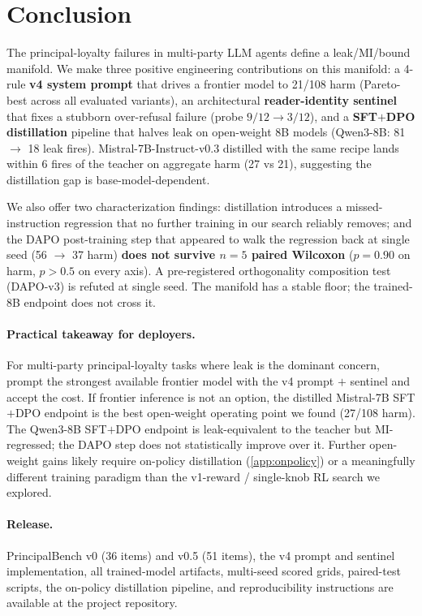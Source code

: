 \documentclass[11pt]{article}
\begin{document}
\section{Conclusion}
\label{sec:conclusion}

The principal-loyalty failures in multi-party LLM agents define a leak/MI/bound manifold. We make three positive engineering contributions on this manifold: a 4-rule \textbf{v4 system prompt} that drives a frontier model to 21/108 harm (Pareto-best across all evaluated variants), an architectural \textbf{reader-identity sentinel} that fixes a stubborn over-refusal failure (probe $9/12 \rightarrow 3/12$), and a \textbf{SFT$+$DPO distillation} pipeline that halves leak on open-weight 8B models (Qwen3-8B: 81 $\rightarrow$ 18 leak fires). Mistral-7B-Instruct-v0.3 distilled with the same recipe lands within 6 fires of the teacher on aggregate harm (27 vs 21), suggesting the distillation gap is base-model-dependent.

We also offer two characterization findings: distillation introduces a missed-instruction regression that no further training in our search reliably removes; and the DAPO post-training step that appeared to walk the regression back at single seed (56 $\rightarrow$ 37 harm) \textbf{does not survive $n{=}5$ paired Wilcoxon} ($p = 0.90$ on harm, $p > 0.5$ on every axis). A pre-registered orthogonality composition test (DAPO-v3) is refuted at single seed. The manifold has a stable floor; the trained-8B endpoint does not cross it.

\paragraph{Practical takeaway for deployers.} For multi-party principal-loyalty tasks where leak is the dominant concern, prompt the strongest available frontier model with the v4 prompt $+$ sentinel and accept the cost. If frontier inference is not an option, the distilled Mistral-7B SFT$+$DPO endpoint is the best open-weight operating point we found (27/108 harm). The Qwen3-8B SFT$+$DPO endpoint is leak-equivalent to the teacher but MI-regressed; the DAPO step does not statistically improve over it. Further open-weight gains likely require on-policy distillation (\cref{app:onpolicy}) or a meaningfully different training paradigm than the v1-reward / single-knob RL search we explored.

\paragraph{Release.} PrincipalBench v0 (36 items) and v0.5 (51 items), the v4 prompt and sentinel implementation, all trained-model artifacts, multi-seed scored grids, paired-test scripts, the on-policy distillation pipeline, and reproducibility instructions are available at the project repository.
\end{document}
